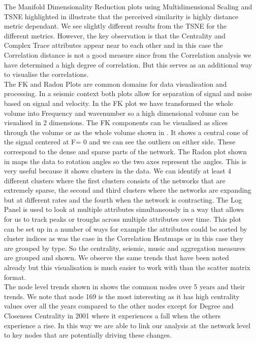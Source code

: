 The Manifold Dimensionality Reduction plots using Multidimensional Scaling and TSNE highlighted in   illustrate that the perceived similarity is highly distance metric dependant. We see slightly different results from the TSNE for the different metrics. However, the key observation is that the Centrality and Complex Trace attributes appear near to each other and in this case the Correlation distance is not a good measure since from the Correlation analysis we have determined a high degree of correlation. But this serves as an additional way to visualise the correlations.  \\

The FK and Radon Plots are common domains for data visualisation and processing. In a seismic context both plots allow for separation of signal and noise based on signal and velocity. In the FK plot we have transformed the whole volume into Frequency and wavenumber so a high dimensional volume can be visualised in 2 dimensions. The FK components can be visualised as slices through the volume or as the whole volume shown in . It shows a central cone of the signal centered at F= 0 and we can see the outliers on either side. These correspond to the dense and sparse parts of the network. The Radon plot shown in  maps the data to rotation angles so the two axes represent the angles. This is very useful because it shows clusters in the data. We can identify at least 4 different clusters where the first clusters consists of the networks that are extremely sparse, the second and third clusters where the networks are expanding but at different rates and the fourth when the network is contracting. The Log Panel is used to look at multiple attributes simultaneously in a way that allows for us to track peaks or troughs across multiple attributes over time. This plot can be set up in a number of ways for example the attributes could be sorted by cluster indices as was the case in the Correlation Heatmaps or in this case they are grouped by type. So the centrality, seismic, music and aggregation measures are grouped and shown. We observe the same trends that have been noted already but this visualisation is much easier to work with than the scatter matrix format.\\

The node level trends shown in  shows the common nodes over 5 years and their trends. We note that node 169 is the most interesting as it has high centrality values over all the years compared to the other nodes except for Degree and Closeness Centrality in 2001 where it experiences a fall when the others experience a rise. In this way we are able to link our analysis at the network level to key nodes that are potentially driving these changes.\\
